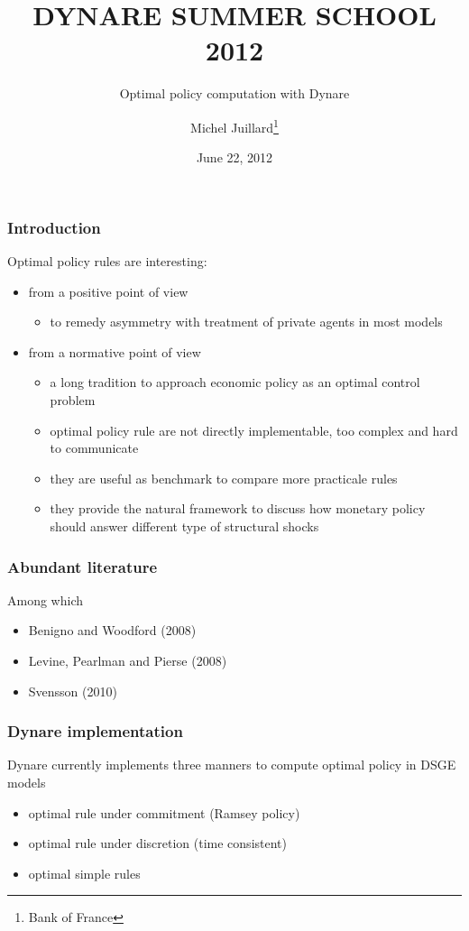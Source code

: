 \documentclass{beamer}
\title{DYNARE SUMMER SCHOOL 2012}
\subtitle{Optimal policy computation with Dynare}
\author{Michel Juillard\footnote{Bank of France}}
\date{June 22, 2012}
\begin{document}
\begin{frame}
  \titlepage
\end{frame}

\begin{frame}
  \frametitle{Introduction}
Optimal policy rules are interesting:
\begin{itemize}
\item from a positive point of view
  \begin{itemize}
  \item to remedy asymmetry with treatment of private agents in most models
  \end{itemize}
\item from a normative point of view
  \begin{itemize}
  \item a long tradition to approach economic policy as an optimal control problem
  \item optimal policy rule are not directly implementable, too complex and hard to communicate
  \item they are useful as benchmark to compare more practicale rules
  \item they provide the natural framework to discuss how monetary policy should answer different type of structural shocks 
  \end{itemize}
\end{itemize}
\end{frame}

\begin{frame}
  \frametitle{Abundant literature}
  Among which
  \begin{itemize}
  \item Benigno and Woodford (2008)
  \item Levine, Pearlman and Pierse (2008)
  \item Svensson (2010)
  \end{itemize}
\end{frame}

\begin{frame}
  \frametitle{Dynare implementation}
Dynare currently implements three manners to compute optimal policy in DSGE models
\begin{itemize}
\item optimal rule under commitment (Ramsey policy)
\item optimal rule under discretion (time consistent)
\item optimal simple rules
\end{itemize}
\end{frame}
\end{document}
